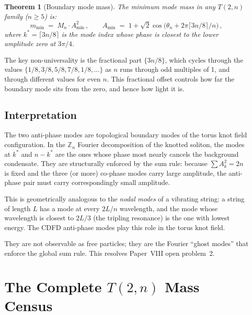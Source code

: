 \documentclass[11pt]{article}
\newtheorem{theorem}{Theorem}
\begin{document}
\begin{theorem}[Boundary mode mass]
  \label{thm:boundary_mass}
  The minimum mode mass in any $T(2,n)$ family ($n \geq 5$) is:
  \begin{equation}
    m_\text{min} \;=\; M_n \cdot A_\text{min}^2\,,
    \qquad
    A_\text{min} \;=\; 1 + \sqrt{2}\cos\!\bigl(\theta_n + 2\pi\lceil 3n/8\rceil/n\bigr)\,,
    \label{eq:boundary_mass}
  \end{equation}
  where $k^* = \lceil 3n/8\rceil$ is the mode index whose phase is
  closest to the lower amplitude zero at $3\pi/4$.
\end{theorem}

The key non-universality is the fractional part $\{3n/8\}$, which cycles
through the values $\{1/8, 3/8, 5/8, 7/8, 1/8, \ldots\}$ as $n$ runs
through odd multiples of 1, and through different values for even $n$.
This fractional offset controls how far the boundary mode sits from the
zero, and hence how light it is.

\subsection{Interpretation}

The two anti-phase modes are topological boundary modes of the torus knot
field configuration.
In the $\mathbb{Z}_n$ Fourier decomposition of the knotted soliton, the
modes at $k^*$ and $n - k^*$ are the ones whose phase most nearly
cancels the background condensate.
They are structurally enforced by the sum rule: because $\sum A_k^2 = 2n$
is fixed and the three (or more) co-phase modes carry large amplitude,
the anti-phase pair must carry correspondingly small amplitude.

This is geometrically analogous to the \emph{nodal modes} of a vibrating
string: a string of length $L$ has a mode at every $2L/n$ wavelength,
and the mode whose wavelength is closest to $2L/3$ (the tripling
resonance) is the one with lowest energy.
The CDFD anti-phase modes play this role in the torus knot field.

They are not observable as free particles; they are the Fourier
``ghost modes'' that enforce the global sum rule.
This resolves Paper~VIII open problem~2.


\section{The Complete $T(2,n)$ Mass Census}
\label{sec:census}
\end{document}
